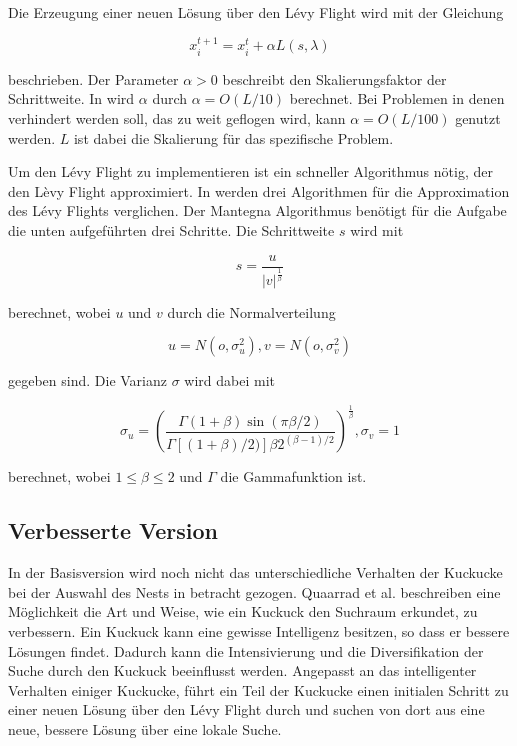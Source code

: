 \documentclass[conference]{IEEEtran}
\begin{document}
      Die Erzeugung einer neuen Lösung über den Lévy Flight wird mit der Gleichung

      \begin{equation}
      x_{i}^{t+1} = x_{i}^{t} + \alpha L(s, \lambda)\label{eq}
      \end{equation}

      beschrieben. Der Parameter $\alpha > 0$ beschreibt den Skalierungsfaktor der Schrittweite.  
      In \cite{b7} wird $\alpha$ durch $\alpha = O(L/10)$ berechnet. Bei Problemen in denen verhindert 
      werden soll, das zu weit geflogen wird, kann $\alpha = O(L/100)$ genutzt werden. $L$ ist dabei die 
      Skalierung für das spezifische Problem.

      Um den Lévy Flight zu implementieren ist ein schneller Algorithmus nötig, der den Lèvy Flight approximiert. 
      In \cite{b8} werden drei Algorithmen für die Approximation des Lévy Flights verglichen. Der 
      Mantegna Algorithmus benötigt für die Aufgabe die unten aufgeführten drei Schritte. Die Schrittweite $s$ wird mit
      
      \begin{equation}
        s = \frac{u}{|v|^{\frac{1}{\beta}}}\label{eq}
      \end{equation}

      berechnet, wobei $u$ und $v$ durch die Normalverteilung

      \begin{equation}
        u = N(o,\sigma_{u}^{2}), v = N(o,\sigma_{v}^{2})\label{eq}
      \end{equation}

        gegeben sind. Die Varianz $\sigma$ wird dabei mit

      \begin{equation}
        \sigma_{u} = \left(\frac{\Gamma(1 + \beta)\sin(\pi\beta/2)}{\Gamma[(1 + \beta)/2)]\beta2^{(\beta-1)/2}}\right)^{\frac{1}{\beta}} , \sigma_{v} = 1 \label{eq}
      \end{equation}

      berechnet, wobei $1 \leq \beta \leq 2$ und $\Gamma$ die Gammafunktion ist. 

    \subsection{Verbesserte Version}
      In der Basisversion wird noch nicht das unterschiedliche Verhalten der Kuckucke bei der Auswahl 
      des Nests in betracht gezogen. Quaarrad et al. \cite{b9} beschreiben eine Möglichkeit die Art und 
      Weise, wie ein Kuckuck den Suchraum erkundet, zu verbessern. Ein Kuckuck kann eine gewisse Intelligenz 
      besitzen, so dass er bessere Lösungen findet. Dadurch kann die Intensivierung und die Diversifikation der 
      Suche durch den Kuckuck beeinflusst werden. Angepasst an das intelligenter Verhalten einiger Kuckucke, 
      führt ein Teil der Kuckucke einen initialen Schritt zu einer neuen Lösung über 
      den Lévy Flight durch und suchen von dort aus eine neue, bessere Lösung über eine lokale Suche.
\end{document}

